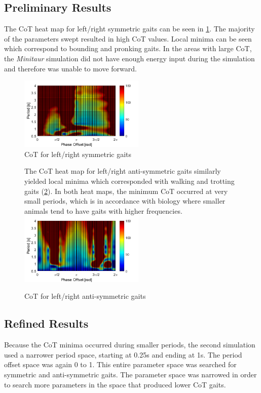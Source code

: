 \documentclass[conference,11pt,letterpaper]{IEEEtran}
\begin{document}
\subsection{Preliminary Results}
The CoT heat map for left/right symmetric gaits can be seen in \cref{fig:sync_gait}. The majority of the parameters swept resulted in high CoT values. Local minima can be seen which correspond to bounding and pronking gaits. In the areas with large CoT, the \emph{Minitaur} simulation did not have enough energy input during the simulation and therefore was unable to move forward.
           \begin{figure}[ht!]
         
           \includegraphics[width=0.53\textwidth]{smooth_CoT_sync_gait}
           \caption{CoT for left/right symmetric gaits}
           \label{fig:sync_gait}
           \end{figure}
                      \begin{figure}[ht!]
The CoT heat map for left/right anti-symmetric gaits similarly yielded local minima which corresponded with walking and trotting gaits (\cref{fig:unsync_gait}). In both heat maps, the minimum CoT occurred at very small periods, which is in accordance with biology where smaller animals tend to have gaits with higher frequencies.         
           \includegraphics[width=0.53\textwidth]{smooth_CoT_unsync_gait}
           \caption{CoT for left/right anti-symmetric gaits}
           \label{fig:unsync_gait}
           \end{figure}

\subsection{Refined Results}
Because the CoT minima occurred during smaller periods, the second simulation used a narrower period space, starting at 0.25s and ending at 1s. The period offset space was again 0 to 1. This entire parameter space was searched for symmetric and anti-symmetric gaits. The parameter space was narrowed in order to search more parameters in the space that produced lower CoT gaits.
\end{document}
